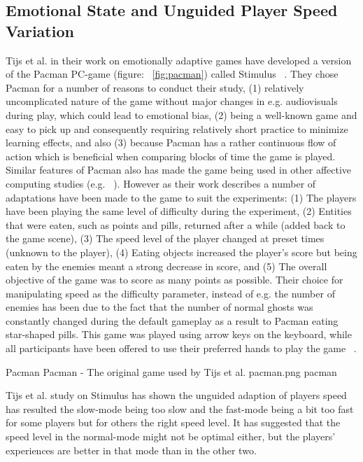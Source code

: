\subsection{Emotional State and Unguided Player Speed Variation}
Tijs et al. in their work on emotionally adaptive games have developed a version of the Pacman PC-game (figure: ~\ref{fig:pacman}) called Stimulus ~\cite{tijs2009creating}. They chose Pacman for a number of reasons to conduct their study, (1) relatively uncomplicated nature of the game without major changes in e.g. audiovisuals during play, which could lead to emotional bias, (2) being a well-known game and easy to pick up and consequently requiring relatively short practice to minimize learning effects, and also (3) because Pacman has a rather continuous flow of action which is beneficial when comparing blocks of time the game is played. Similar features of Pacman also has made the game being used in other affective computing studies (e.g. ~\cite{yannakakis2007towards}). However as their work describes a number of adaptations have been made to the game to suit the experiments: (1) The players have been playing the same level of difficulty during the experiment, (2) Entities that were eaten, such as points and pills, returned after a while (added back to the game scene), (3) The speed level of the player changed at preset times (unknown to the player), (4) Eating objects increased the player's score but being eaten by the enemies meant a strong decrease in score, and (5) The overall objective of the game was to score as many points as possible. Their choice for manipulating speed as the difficulty parameter, instead of e.g. the number of enemies has been due to the fact that the number of normal ghosts was constantly changed during the default gameplay as a result to Pacman eating star-shaped pills. This game was played using arrow keys on the keyboard, while all participants have been offered to use their preferred hands to play the game ~\cite{tijs2009creating}.

\img
{Pacman}
{Pacman - The original game used by Tijs et al.}
{pacman.png}
{pacman}

Tijs et al. study on Stimulus has shown the unguided adaption of players speed has resulted the slow-mode being too slow and the fast-mode being a bit too fast for some players but for others the right speed level. It has suggested that the speed level in the normal-mode might not be optimal either, but the players' experiences are better in that mode than in the other two.

